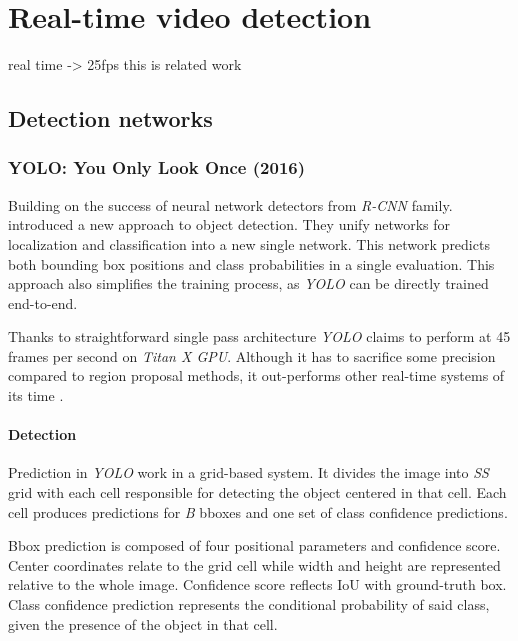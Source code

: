 
\chapter{Real-time video detection}
\label{chap:rltm}

real time -> 25fps
this is related work

\section{Detection networks}


\subsection{YOLO: You Only Look Once (2016)}
\label{sec:yolo}
Building on the success of neural network detectors from \textit{R-CNN} family. \citeauthor{bib:yolo} \cite{bib:yolo} introduced a new approach to object detection. They unify networks for localization and classification into  a new single network. This network predicts both bounding box positions and class probabilities in a single evaluation. This approach also simplifies the training process, as \textit{YOLO} can be directly trained end-to-end. 

Thanks to straightforward single pass architecture \textit{YOLO} claims to perform at 45 frames per second on \textit{Titan X GPU}. Although it has to sacrifice some precision compared to region proposal methods, it out-performs other real-time systems of its time \cite{bib:overfeat}.


\subsubsection{Detection}
Prediction in \textit{YOLO} work in a grid-based system. It divides the image into \textit{S\x S} grid with each cell responsible for detecting the object centered in that cell.  Each cell produces predictions for \textit{B} bboxes and one set of class confidence predictions. 

Bbox prediction is composed of four positional parameters and confidence score. Center coordinates relate to the grid cell while width and height are represented relative to the whole image. Confidence score reflects IoU with ground-truth box. Class confidence prediction represents the conditional probability of said class, given the presence of the object in that cell. 

